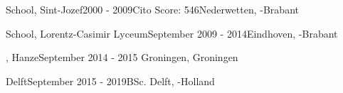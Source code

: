 \begin{rSection}{}
{%
  \begin{experienceItem}
    { School, Sint-Jozef}{2000 - 2009}{Cito Score: 546}{Nederwetten, -Brabant}
\end{experienceItem}

  \begin{experienceItem}
    { School, Lorentz-Casimir Lyceum}{September 2009 -  2014}{}{Eindhoven, -Brabant}
  \end{experienceItem}

  \begin{experienceItem}
    {, Hanze}{September 2014 -  2015} { }{Groningen, Groningen}
  \end{experienceItem}}{}

  \begin{experienceItem}
    { Delft}{September 2015 -  2019}{BSc. }{Delft, -Holland}
  \end{experienceItem}



\end{rSection}
